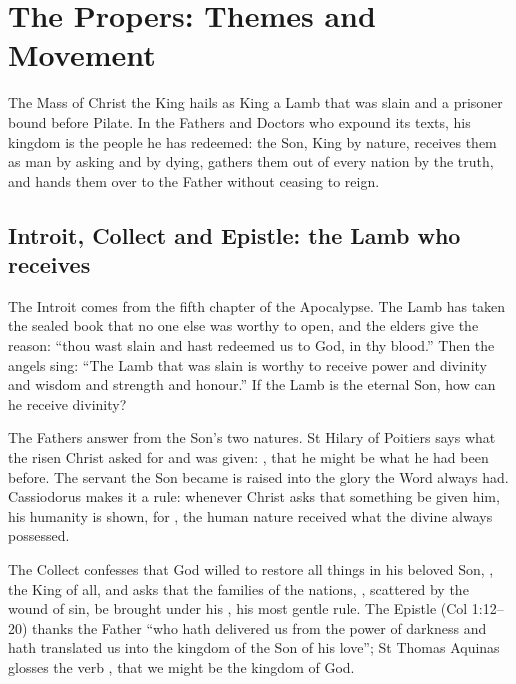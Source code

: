 \section{The Propers: Themes and Movement}

The Mass of Christ the King hails as King a Lamb that was slain and a prisoner
bound before Pilate. In the Fathers and Doctors who expound its texts, his
kingdom is the people he has redeemed: the Son, King by nature, receives them
as man by asking and by dying, gathers them out of every nation by the truth,
and hands them over to the Father without ceasing to reign.

\subsection{Introit, Collect and Epistle: the Lamb who receives}

The Introit comes from the fifth chapter of the Apocalypse. The Lamb has taken
the sealed book that no one else was worthy to open, and the elders give the
reason: ``thou wast slain and hast redeemed us to God, in thy blood.'' Then
the angels sing: ``The Lamb that was slain
is worthy to receive power and divinity and wisdom and strength and honour.''
If the Lamb is the eternal Son, how can he receive divinity?

The Fathers answer from the Son's two natures. St Hilary of Poitiers says what
the risen Christ asked for and was given: ,
that he might be what he had been before. The servant the Son became is
raised into the glory the Word always had. Cassiodorus makes it a rule:
whenever Christ asks that something be given him, his humanity is shown, for
, the human
nature received what the divine always possessed.

The Collect confesses that God willed to restore all things in his beloved
Son, , the King of all, and asks that the families of
the nations, , scattered by the wound of
sin, be brought under his , his most gentle
rule. The Epistle (Col 1:12--20) thanks the Father ``who hath
delivered us from the power of darkness and hath translated us into the
kingdom of the Son of his love''; St Thomas Aquinas glosses the verb
, that we might be the kingdom of God.

